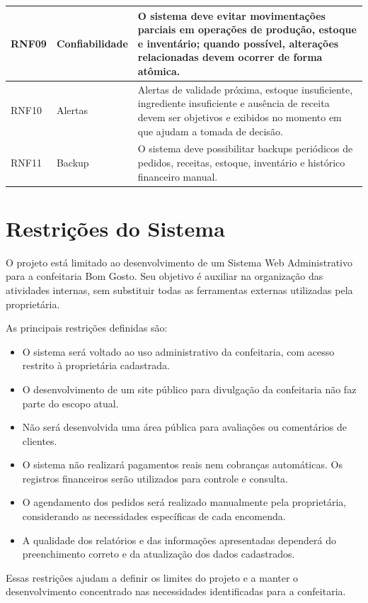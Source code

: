 \begin{quadro}
\begin{tabular}{|p{3cm}|p{3cm}|p{8cm}|}
        RNF09 & Confiabilidade & O sistema deve evitar movimentações parciais em operações de produção, estoque e inventário; quando possível, alterações relacionadas devem ocorrer de forma atômica. \\ \hline

        RNF10 & Alertas & Alertas de validade próxima, estoque insuficiente, ingrediente insuficiente e ausência de receita devem ser objetivos e exibidos no momento em que ajudam a tomada de decisão. \\ \hline

        RNF11 & Backup & O sistema deve possibilitar backups periódicos de pedidos, receitas, estoque, inventário e histórico financeiro manual. \\ \hline
    \end{tabular}

    \vspace{0.2cm}
\end{quadro}


\section{Restrições do Sistema}

O projeto está limitado ao desenvolvimento de um Sistema Web Administrativo para a confeitaria Bom Gosto. Seu objetivo é auxiliar na organização das atividades internas, sem substituir todas as ferramentas externas utilizadas pela proprietária.

As principais restrições definidas são:

\begin{itemize}
    \item O sistema será voltado ao uso administrativo da confeitaria, com acesso restrito à proprietária cadastrada.

    \item O desenvolvimento de um site público para divulgação da confeitaria não faz parte do escopo atual.

    \item Não será desenvolvida uma área pública para avaliações ou comentários de clientes.

    \item O sistema não realizará pagamentos reais nem cobranças automáticas. Os registros financeiros serão utilizados para controle e consulta.

    \item O agendamento dos pedidos será realizado manualmente pela proprietária, considerando as necessidades específicas de cada encomenda.

    \item A qualidade dos relatórios e das informações apresentadas dependerá do preenchimento correto e da atualização dos dados cadastrados.
\end{itemize}

Essas restrições ajudam a definir os limites do projeto e a manter o desenvolvimento concentrado nas necessidades identificadas para a confeitaria.